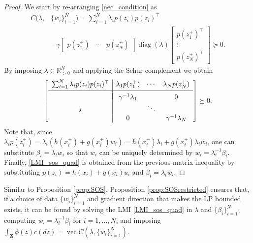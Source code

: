 \documentclass[journal,twoside,web]{ieeecolor}
\newcommand{\Zb}{\mathbf{Z}}
\DeclareMathOperator{\vect}{vec}
\DeclareMathOperator{\diag}{diag}
\begin{document}
\begin{proof}
	We start by re-arranging \eqref{nec_condition} as
	\begin{equation*}
		\begin{aligned}
			C(\lambda,&\{w_i\}_{i=1}^{N}) = \sum_{i=1}^{N} \lambda_i p(z_i)p(z_i)^\top \\
			& - \gamma \begin{bmatrix} p(z_1^+) & \cdots & p(z_N^+) \end{bmatrix} \diag (\lambda)\begin{bmatrix} p(z^+_1)^\top \\ \vdots \\ p(z^+_N)^\top \end{bmatrix} \succeq0.
		\end{aligned}
	\end{equation*}
By imposing $\lambda\in\mathbb{R}^{N}_{>0}$ and applying the Schur complement we obtain
%
\begin{equation*}
	\left[\begin{array}{c|ccc}
		\sum_{i=1}^{N} \lambda_i p(z_i)p(z_i)^\top & \lambda_1p(z_1^+) & \cdots & \lambda_Np(z_N^+) \\[0.1cm]
		\hline\\[-0.3cm]
		& \gamma^{-1} \lambda_1 & & 0 \\
		\star & & \ddots & \\
		& 0 & & \gamma^{-1} \lambda_N
	\end{array}\right] \succeq0 .
\end{equation*} 
Note that, since $\lambda_i p(z_i^+) = \lambda_i (h(x_i^+) + g(x_i^+)w_i) = h(x_i^+)\lambda_i + g(x_i^+)\lambda_i w_i$, one can substitute $\beta_i=\lambda_i w_i$ so that $w_i$ can be uniquely determined by $w_i = \lambda_i^{-1} \beta_i$. Finally, \eqref{LMI_sos_quad} is obtained from the previous matrix inequality by substituting $p(z_i) = h(x_i) + g(x_i)u_i$ and $\beta_i = \lambda_i w_i$.
\end{proof}

Similar to Proposition \ref{prop:SOS}, Proposition \ref{prop:SOSrestricted} ensures that, if a choice of data $\{w_i\}^N_{i=1}$ and gradient direction that makes the LP bounded exists, it can be found by solving the LMI \eqref{LMI_sos_quad} in $\lambda$ and $\{\beta_i\}^N_{i=1}$, computing $w_i=\lambda_i^{-1}\beta_i$ for $i=1,\ldots,N$, and imposing $\int_{\Zb} \phi (z) c(dz) = \vect C(\lambda,\{w_i\}_{i=1}^{N})$.
\fi

\end{document}
